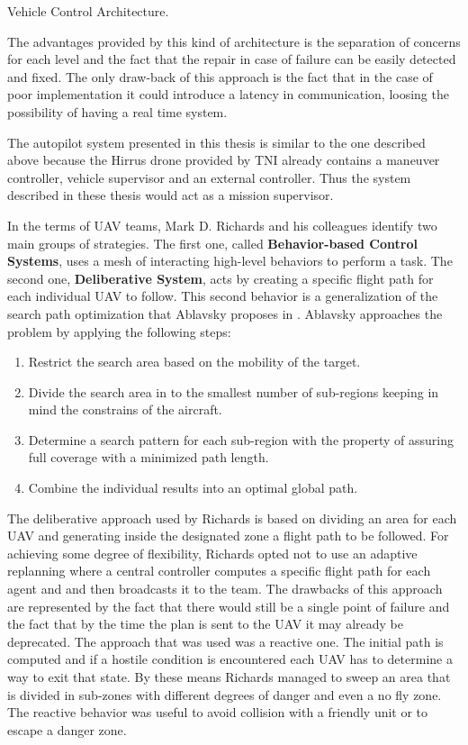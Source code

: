 {Vehicle Control Architecture.}

\newpage
The advantages provided by this kind of architecture is the separation of
concerns for each level and the fact that the repair in case of failure can be
easily detected and fixed. The only draw-back of this approach is the fact
that in the case of poor implementation it could introduce a latency in communication, 
loosing the possibility of having a real time system.

The autopilot system presented in this thesis is similar to the one described
above because the Hirrus drone \cite{hirrus} provided by TNI already contains
a maneuver controller, vehicle supervisor and an external controller. Thus the
system described in these thesis would act as a mission supervisor.

In the terms of UAV teams, Mark D. Richards and his colleagues \cite{cooperative}
identify two main groups of strategies. The first one, called \textbf{Behavior-based
Control Systems}, uses a mesh of interacting high-level behaviors to perform a 
task. The second one, \textbf{Deliberative System}, acts by creating a specific
flight path for each individual UAV to follow. This second behavior is a 
generalization of the search path optimization that  Ablavsky proposes in 
  \cite{path-optimization}. Ablavsky approaches the problem by applying the 
following steps:

\begin{enumerate}
\item Restrict the search area based on the mobility of the target.
\item Divide the search area in to the smallest number of sub-regions keeping in
mind the constrains of the aircraft.
\item Determine a search pattern for each sub-region with the property of assuring
full coverage with a minimized path length.
\item Combine the individual results into an optimal global path.
\end{enumerate}

The deliberative approach used by Richards is based on dividing an area for 
each UAV and generating inside the designated zone a flight path to be followed.
For achieving some degree of flexibility, Richards opted not to use an adaptive
replanning where a central controller computes a specific flight path for each
agent and and then broadcasts it to the team. The drawbacks of this approach are
represented by the fact that there would still be a single point of failure and
the fact that by the time the plan is sent to the UAV it may already be 
deprecated. The approach that was used was a reactive one. The initial path
is computed and if a hostile condition is encountered each UAV has to determine
a way to exit that state. By these means Richards managed to sweep an area
that is divided in sub-zones with different degrees of danger and even a no fly
zone. The reactive behavior was useful to avoid collision with a friendly unit
or to escape a danger zone.

